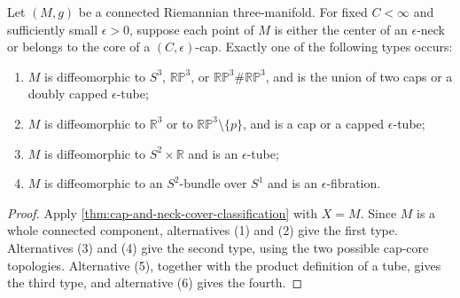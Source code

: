 \begin{theorem}
\label{thm:canonical-neck-cap-topology}
\notready
Let $(M,g)$ be a connected Riemannian three-manifold.  For fixed
$C<\infty$ and sufficiently small $\epsilon>0$, suppose each point of
$M$ is either the center of an $\epsilon$-neck or belongs to the core of a
$(C,\epsilon)$-cap.  Exactly one of the following types occurs:
\begin{enumerate}
\item $M$ is diffeomorphic to $S^3$, $\mathbb{RP}^3$, or
      $\mathbb{RP}^3\#\mathbb{RP}^3$, and is the union of two caps or a
      doubly capped $\epsilon$-tube;
\item $M$ is diffeomorphic to $\mathbb R^3$ or to
      $\mathbb{RP}^3\setminus\{p\}$, and is a cap or a capped
      $\epsilon$-tube;
\item $M$ is diffeomorphic to $S^2\times\mathbb R$ and is an
      $\epsilon$-tube;
\item $M$ is diffeomorphic to an $S^2$-bundle over $S^1$ and is an
      $\epsilon$-fibration.
\end{enumerate}
\end{theorem}

\begin{proof}
Apply \ref{thm:cap-and-neck-cover-classification} with $X=M$.  Since $M$
is a whole connected component, alternatives (1) and (2) give the first
type.  Alternatives (3) and (4) give the second type, using the two possible
cap-core topologies.  Alternative (5), together with the product definition
of a tube, gives the third type, and alternative (6) gives the fourth.
\end{proof}
